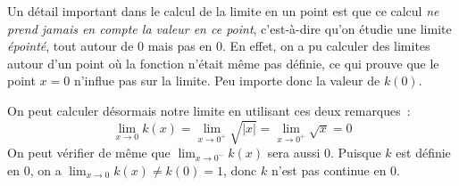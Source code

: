 \begin{exercice}
\begin{enumerate}
    Un détail important dans le calcul de la limite en un point est que ce calcul \emph{ne prend jamais en compte la valeur en ce point}, c'est-à-dire qu'on étudie une limite \emph{épointé}, tout autour de $0$ mais pas en $0$. En effet, on a pu calculer des limites autour d'un point où la fonction n'était même pas définie, ce qui prouve que le point $x = 0$ n'influe pas sur la limite. Peu importe donc la valeur de $k(0)$.
    
    On peut calculer désormais notre limite en utilisant ces deux remarques~:
    \[
    \lim_{x \to 0} k(x) = \lim_{x \to 0^+} \sqrt{|x|} = \lim_{x \to 0^+} \sqrt{x} = 0
    \]
    On peut vérifier de même que $\displaystyle\lim_{x \to 0^-} k(x)$ sera aussi 0. Puisque $k$ est définie en 0, on a $\displaystyle\lim_{x \to 0} k(x) \neq k(0) = 1$, donc $k$ n'est pas continue en $0$.
\end{enumerate}
\end{exercice}

